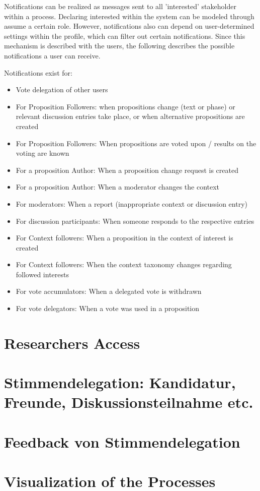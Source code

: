 Notifications can be realized as messages sent to all 'interested' stakeholder within a process. Declaring interested within the system can be modeled through assume a certain role. However, notifications also can depend on user-determined settings within the profile, which can filter out certain notifications. Since this mechanism is described with the users, the following describes the possible notifications a user can receive.

Notifications exist for:
\begin{itemize}
\item Vote delegation of other users 
\item For Proposition Followers: when propositions change (text or phase) or relevant discussion entries take place, or when alternative propositions are created
\item For Proposition Followers: When propositions are voted upon / results on the voting are known
\item For a proposition Author: When a proposition change request is created
\item For a proposition Author: When a moderator changes the context
\item For moderators: When a report (inappropriate context or discussion entry)
\item For discussion participants: When someone responds to the respective entries
\item For Context followers: When a proposition in the context of interest is created
\item For Context followers: When the context taxonomy changes regarding followed interests
\item For vote accumulators: When a delegated vote is withdrawn
\item For vote delegators: When a vote was used in a proposition 
\end{itemize}

\section{Researchers Access}
\label{sec:Model_ResearchersAccess}

\section{Stimmendelegation: Kandidatur, Freunde, Diskussionsteilnahme etc.}
\label{sec:Model_VoteDelegation}

\section{Feedback von Stimmendelegation}
\label{sec:Model_VoteFeedback}

\section{Visualization of the Processes}
\label{sec:Model_Visualization}